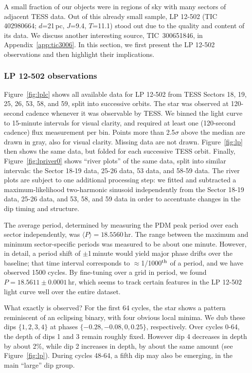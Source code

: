 \documentclass[11pt,twocolumn,tighten]{aastex63}
\begin{document}
A small fraction of our objects were in regions of sky with many
sectors of adjacent TESS data.  Out of this already small sample, LP
12-502 (TIC 402980664; $d$=21\,pc, $J$=9.4, $T$=11.1) stood out due to
the quality and content of its data.  We discuss another interesting
source, TIC~300651846, in Appendix~\ref{app:tic3006}.  In this
section, we first present the LP 12-502 observations and then
highlight their implications.


\subsubsection{LP 12-502 observations}
\label{subsec:lpobservations}

Figure~\ref{fig:lplc} shows all available data for LP 12-502 from TESS
Sectors 18, 19, 25, 26, 53, 58, and 59, split into successive orbits.
The star was observed at 120-second cadence whenever it was observable
by TESS.  We binned the light curve to 15-minute intervals for visual
clarity, and required at least one (120-second cadence) flux
measurement per bin.  Points more than 2.5$\sigma$ above the median
are drawn in gray, also for visual clarity.  Missing data are not
drawn.  Figure~\ref{fig:lp} then shows the same data, but folded for
each successive TESS orbit.  Finally, Figure~\ref{fig:lpriver0} shows
``river plots'' of the same data, split into similar intervals: the
Sector 18-19 data, 25-26 data, 53 data, and 58-59 data.  The river
plots are subject to one additional processing step: we fitted and
subtracted a maximum-likelihood two-harmonic sinusoid independently
from the Sector 18-19 data, 25-26 data, and 53, 58, and 59 data in
order to accentuate changes in the dip timing and structure.

The average period, determined by measuring the PDM peak period over
each sector independently, was $\langle P \rangle = 18.5560$\,hr.  The
range between the maximum and minimum sector-specific periods was
measured to be about one minute.   However, in detail, a period shift
of $\pm$1\,minute would yield major phase drifts over the baseline;
that time interval corresponds to $\approx$1/1000$^{\rm th}$ of a
period, and we have observed 1500 cycles.  By fine-tuning over a grid
in period, we found $P=18.5611 \pm 0.0001$\,hr, which seems to track
certain features in the LP 12-502 light curve well over the entire
dataset.

What exactly is observed?  For the first 64 cycles, the star shows a
pattern reminiscent of an eclipsing binary, with four obvious local
minima.  We dub these dips $\{ 1, 2, 3, 4 \}$ at phases $\{ -0.28,
-0.08, 0, 0.25 \}$, respectively.  Over cycles 0-64, the depth of dips
1 and 3 remain roughly fixed.  However dip 4 decreases in depth by
about 2\%, while dip 2 increases in depth, by about the same amount
(see Figure~\ref{fig:lp}).  During cycles 48-64, a fifth dip may also
be emerging, in the main ``large'' dip group.
\end{document}

